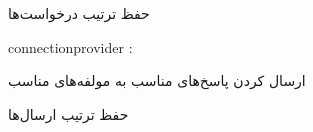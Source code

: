\begin{itemize}
\begin{itemize}
		 حفظ ترتیب درخواست‌ها

	\end{itemize}

	

	 connectionprovider : 

	\begin{itemize}

		 ارسال کردن پاسخ‌های مناسب به مولفه‌های مناسب

		 حفظ ترتیب ارسال‌ها

		

	\end{itemize}	

\end{itemize}





